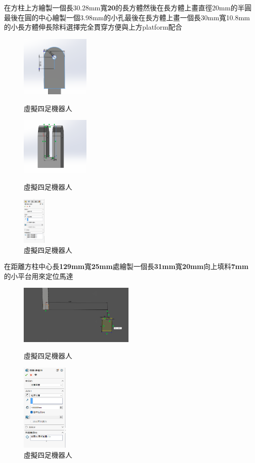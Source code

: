 \noindent 在方柱上方繪製一個長30.28mm寬\textbf{20}的長方體然後在長方體上畫直徑20mm的半圓最後在圓的中心繪製一個3.98mm的小孔最後在長方體上畫一個長30mm寬10.8mm的小長方體伸長除料選擇完全貫穿方便與上方platform配合

\begin{figure}[h!]
    \centering
    \includegraphics[width=0.3\textwidth]{./../images/6-1-30.png}
    \caption{\Large 虛擬四足機器人}
    \includegraphics[width=0.3\textwidth]{./../images/6-1-31.png}
    \caption{\Large 虛擬四足機器人}
    \includegraphics[width=0.1\textwidth]{./../images/6-1-32.png}
    \caption{\Large 虛擬四足機器人}
\end{figure}

\noindent 在距離方柱中心長\textbf{129mm}寬\textbf{25mm}處繪製一個長\textbf{31mm}寬\textbf{20mm}向上填料\textbf{7mm}的小平台用來定位馬達

\begin{figure}[h!]
    \centering
    \includegraphics[width=0.5\textwidth]{./../images/6-1-33.png}
    \caption{\Large 虛擬四足機器人}
    \includegraphics[width=0.2\textwidth]{./../images/6-1-34.png}
    \caption{\Large 虛擬四足機器人}
\end{figure}

